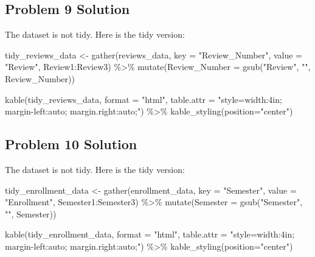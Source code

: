\documentclass[
  letterpaper,
  DIV=11,
  numbers=noendperiod]{scrreprt}
\newenvironment{Shaded}{\begin{snugshade}}{\end{snugshade}}
\newcommand{\AttributeTok}[1]{\textcolor[rgb]{0.40,0.45,0.13}{#1}}
\newcommand{\FunctionTok}[1]{\textcolor[rgb]{0.28,0.35,0.67}{#1}}
\newcommand{\NormalTok}[1]{\textcolor[rgb]{0.00,0.23,0.31}{#1}}
\newcommand{\OtherTok}[1]{\textcolor[rgb]{0.00,0.23,0.31}{#1}}
\newcommand{\SpecialCharTok}[1]{\textcolor[rgb]{0.37,0.37,0.37}{#1}}
\newcommand{\StringTok}[1]{\textcolor[rgb]{0.13,0.47,0.30}{#1}}
\begin{document}
\subsection*{Problem 9 Solution}\label{problem-9-solution}

The dataset is not tidy. Here is the tidy version:

\begin{Shaded}
\begin{Highlighting}[]
\NormalTok{tidy\_reviews\_data }\OtherTok{\textless{}{-}} \FunctionTok{gather}\NormalTok{(reviews\_data, }\AttributeTok{key =} \StringTok{"Review\_Number"}\NormalTok{, }\AttributeTok{value =} \StringTok{"Review"}\NormalTok{, Review1}\SpecialCharTok{:}\NormalTok{Review3) }\SpecialCharTok{\%\textgreater{}\%}
  \FunctionTok{mutate}\NormalTok{(}\AttributeTok{Review\_Number =} \FunctionTok{gsub}\NormalTok{(}\StringTok{"Review"}\NormalTok{, }\StringTok{""}\NormalTok{, Review\_Number))}

\FunctionTok{kable}\NormalTok{(tidy\_reviews\_data, }\AttributeTok{format =} \StringTok{"html"}\NormalTok{, }\AttributeTok{table.attr =} \StringTok{"style=\textquotesingle{}width:4in; margin{-}left:auto; margin.right:auto;\textquotesingle{}"}\NormalTok{)  }\SpecialCharTok{\%\textgreater{}\%}
  \FunctionTok{kable\_styling}\NormalTok{(}\AttributeTok{position=}\StringTok{"center"}\NormalTok{)}
\end{Highlighting}
\end{Shaded}

\subsection*{Problem 10 Solution}\label{problem-10-solution}

The dataset is not tidy. Here is the tidy version:

\begin{Shaded}
\begin{Highlighting}[]
\NormalTok{tidy\_enrollment\_data }\OtherTok{\textless{}{-}} \FunctionTok{gather}\NormalTok{(enrollment\_data, }\AttributeTok{key =} \StringTok{"Semester"}\NormalTok{, }\AttributeTok{value =} \StringTok{"Enrollment"}\NormalTok{, Semester1}\SpecialCharTok{:}\NormalTok{Semester3) }\SpecialCharTok{\%\textgreater{}\%}
  \FunctionTok{mutate}\NormalTok{(}\AttributeTok{Semester =} \FunctionTok{gsub}\NormalTok{(}\StringTok{"Semester"}\NormalTok{, }\StringTok{""}\NormalTok{, Semester))}

\FunctionTok{kable}\NormalTok{(tidy\_enrollment\_data, }\AttributeTok{format =} \StringTok{"html"}\NormalTok{, }\AttributeTok{table.attr =} \StringTok{"style=\textquotesingle{}width:4in; margin{-}left:auto; margin.right:auto;\textquotesingle{}"}\NormalTok{)  }\SpecialCharTok{\%\textgreater{}\%}
  \FunctionTok{kable\_styling}\NormalTok{(}\AttributeTok{position=}\StringTok{"center"}\NormalTok{)}
\end{Highlighting}
\end{Shaded}
\end{document}

